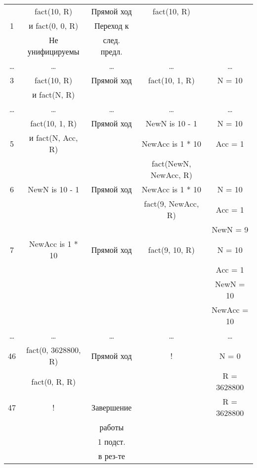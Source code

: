 \begin{landscape}
\begin{longtable}{|c|c|c|c|c|}
        \hline
              & fact(10, R) & Прямой ход & fact(10, R) & \\
            1 & и fact(0, 0, R) & Переход к & &\\
			  & Не унифицируемы & след. предл. & &\\
			\hline
			\dots & \dots & \dots & \dots & \dots \\
			\hline 
			3 & fact(10, R) & Прямой ход & fact(10, 1, R) & N = 10\\
              & и fact(N, R) & & &\\
            \hline
			\dots & \dots & \dots & \dots & \dots \\
		    \hline 
			  & fact(10, 1, R) & Прямой ход & NewN is 10 - 1 & N = 10\\
            5 & и fact(N, Acc, R) & & NewAcc is 1 * 10 & Acc = 1\\
              & & & fact(NewN, NewAcc, R) & \\
            \hline 
			6 & NewN is 10 - 1 & Прямой ход & NewAcc is 1 * 10 & N = 10\\
              & & & fact(9, NewAcc, R) & Acc = 1\\
              & & & & NewN = 9\\
            \hline 
			7 & NewAcc is 1 * 10 & Прямой ход & fact(9, 10, R) & N = 10\\
              & & & & Acc = 1\\
              & & & & NewN = 10\\
              & & & & NewAcc = 10\\
            \hline
			\dots & \dots & \dots & \dots & \dots \\
            \hline 
			46 & fact(0, 3628800, R) & Прямой ход & ! & N = 0\\
               & fact(0, R, R) & & & R = 3628800\\
			\hline
            47 & ! & Завершение & & R = 3628800 \\
              & & работы & &\\
              & & 1 подст. & & \\
              & & в рез-те & & \\
    \end{longtable}
\end{landscape}